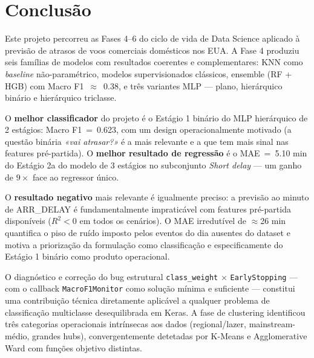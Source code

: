 \documentclass[conference]{IEEEtran}
\begin{document}
\section{Conclusão}

Este projeto percorreu as Fases 4–6 do ciclo de vida de Data Science aplicado à
previsão de atrasos de voos comerciais domésticos nos EUA. A Fase 4 produziu seis
famílias de modelos com resultados coerentes e complementares: KNN como
\textit{baseline} não-paramétrico, modelos supervisionados clássicos, ensemble
(RF + HGB) com Macro F1~$\approx$~0.38, e três variantes MLP — plano,
hierárquico binário e hierárquico triclasse.

O \textbf{melhor classificador} do projeto é o Estágio 1 binário do MLP hierárquico
de 2 estágios: Macro F1~=~0.623, com um design operacionalmente motivado (a questão
binária \textit{«vai atrasar?»} é a mais relevante e a que tem mais sinal nas
features pré-partida). O \textbf{melhor resultado de regressão} é o MAE~=~5.10 min
do Estágio 2a do modelo de 3 estágios no subconjunto \textit{Short delay} — um ganho
de $9\times$ face ao regressor único.

O \textbf{resultado negativo} mais relevante é igualmente preciso: a previsão ao
minuto de ARR\_DELAY é fundamentalmente impraticável com features pré-partida
disponíveis ($R^2 < 0$ em todos os cenários). O MAE irredutível de $\approx$26 min
quantifica o piso de ruído imposto pelos eventos do dia ausentes do dataset e motiva
a priorização da formulação como classificação e especificamente do Estágio 1 binário
como produto operacional.

O diagnóstico e correção do bug estrutural \texttt{class\_weight} $\times$
\texttt{EarlyStopping} — com o callback \texttt{MacroF1Monitor} como solução
mínima e suficiente — constitui uma contribuição técnica diretamente aplicável
a qualquer problema de classificação multiclasse desequilibrada em Keras.
A fase de clustering identificou três categorias operacionais intrínsecas aos dados
(regional/lazer, mainstream-médio, grandes hubs), convergentemente detetadas por
K-Means e Agglomerative Ward com funções objetivo distintas.
\end{document}
